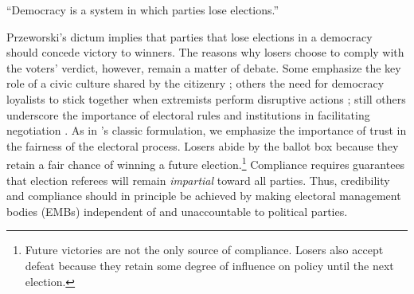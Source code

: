 \documentclass[12 pt, letter]{article}
\begin{document}


\begin{flushright}
\singlespacing
``Democracy is a system in which parties lose elections.'' \\ \citet[p. 10]{Przeworski1991}
\doublespacing
\end{flushright}

Przeworski's dictum implies that parties that lose elections in a
democracy should concede victory to winners.  The reasons why losers
choose to comply with the voters' verdict, however, remain a matter
of debate. Some emphasize the key role of a civic culture shared by
the citizenry \citep[e.g.][]{Putnam2000}; others the need for
democracy loyalists to stick together when extremists perform
disruptive actions \citep[e.g.][]{Linz1978}; still others underscore
the importance of electoral rules and institutions in facilitating
negotiation \citep[e.g.][]{Jones1995}.  As in
\citeauthor{Przeworski1991}'s classic formulation, we emphasize the
importance of trust in the fairness of the electoral process.
Losers abide by the ballot box because they retain a fair chance of
winning a future election.\footnote{Future victories are not the
only source of compliance. Losers also accept defeat because they
retain some degree of influence on policy until the next election.}
Compliance requires guarantees that election referees will remain
\emph{impartial} toward all parties.  Thus, credibility and
compliance should in principle be achieved by making electoral
management bodies (EMBs) independent of and unaccountable to
political parties.
\end{document}
